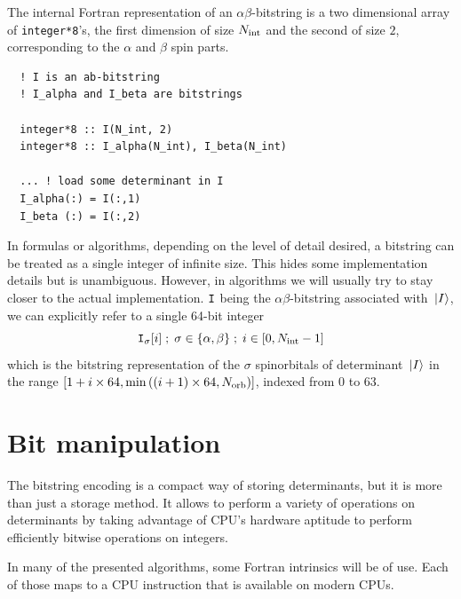 The internal Fortran representation of an $\alpha \beta$-bitstring is a two dimensional array of \lstinline{integer*8}'s, the first dimension of size ${N_\text{int}}$ and the second of size $2$, corresponding to the $\alpha$ and $\beta$ spin parts.


\lstset{frame=single}
\begin{lstlisting}
  ! I is an ab-bitstring
  ! I_alpha and I_beta are bitstrings
  
  integer*8 :: I(N_int, 2)
  integer*8 :: I_alpha(N_int), I_beta(N_int)

  ... ! load some determinant in I
  I_alpha(:) = I(:,1)
  I_beta (:) = I(:,2)
\end{lstlisting}
\lstset{frame=none}


In formulas or algorithms, depending on the level of detail desired, a bitstring can be treated as a single integer of infinite size. This hides some implementation details but is unambiguous. However, in algorithms we will usually try to stay closer to the actual implementation. ${\texttt{I}}$ being the $\alpha \beta$-bitstring associated with ${\ket*{I}}$, we can explicitly refer to a single 64-bit integer
$${\texttt{I}}_{\sigma}[i]\; ;\; \sigma \in \{\alpha, \beta\}\; ;\; i \in [0, {N_\text{int}}-1]$$
which is the bitstring representation of the $\sigma$ spinorbitals of determinant ${\ket*{I}}$ in the range $[1+i \times 64, \min \left( (i+1) \times 64, {N_\text{orb}} \right)]$, indexed from $0$ to $63$.

      
\section{Bit manipulation}

The bitstring encoding is a compact way of storing determinants, but it is more than just a storage method. It allows to perform a variety of operations on determinants by taking advantage of CPU's hardware aptitude to perform efficiently bitwise operations on integers.

In many of the presented algorithms, some Fortran intrinsics will be of use. Each of those maps to a CPU instruction that is available on modern CPUs.


